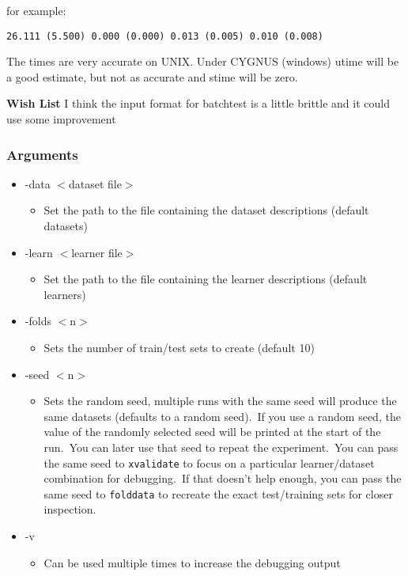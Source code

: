 for example:

{\tt 26.111 (5.500) 0.000 (0.000) 0.013 (0.005) 0.010 (0.008)}

The times are very accurate on UNIX. Under CYGNUS (windows) utime will be a good estimate, but not as accurate and stime will be zero.

\begin{Desc}
\item[{\bf Wish List}]I think the input format for batchtest is a little brittle and it could use some improvement \end{Desc}
\subsubsection*{Arguments}

\begin{itemize}
\item -data $<$dataset file$>$\begin{itemize}
\item Set the path to the file containing the dataset descriptions (default datasets)\end{itemize}
\item -learn $<$learner file$>$\begin{itemize}
\item Set the path to the file containing the learner descriptions (default learners)\end{itemize}
\item -folds $<$n$>$\begin{itemize}
\item Sets the number of train/test sets to create (default 10)\end{itemize}
\item -seed $<$n$>$\begin{itemize}
\item Sets the random seed, multiple runs with the same seed will produce the same datasets (defaults to a random seed).\  If you use a random seed, the value of the randomly selected seed will be printed at the start of the run.\  You can later use that seed to repeat the experiment.\  You can pass the same seed to {\tt xvalidate} to focus on a particular learner/dataset combination for debugging.\  If that doesn't help enough, you can pass the same seed to {\tt folddata} to recreate the exact test/training sets for closer inspection.\end{itemize}
\item -v\begin{itemize}
\item Can be used multiple times to increase the debugging output\end{itemize}
\end{itemize}


